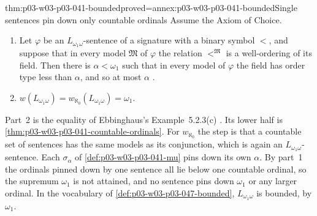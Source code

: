 \begin{hbcorollary}{thm:p03-w03-p03-041-bounded}{proved=annex:p03-w03-p03-041-bounded}{Single sentences pin down only countable ordinals}
Assume the Axiom of Choice.
\begin{enumerate}
\item Let \(\varphi\) be an \(L_{\omega_1\omega}\)-sentence of a signature
      with a binary symbol \(<\), and suppose that in every model
      \(\mathfrak M\) of \(\varphi\) the relation \(<^{\mathfrak M}\) is a
      well-ordering of its field. Then there is \(\alpha<\omega_1\) such
      that in every model of \(\varphi\) the field has order type less
      than \(\alpha\), and so at most \(\alpha\)
      \cite[Corollary~4.28, p.~52]{Marker2014InfinitaryNotes}.
\item \(w(L_{\omega_1\omega})=w_{\aleph_0}(L_{\omega_1\omega})=\omega_1\).
\end{enumerate}
\end{hbcorollary}

Part~2 is the equality of Ebbinghaus's Example~5.2.3(c)
\cite[Ch.~II, Example~5.2.3(c), pp.~61--62]{Ebbinghaus1985ExtendedLogics}.
Its lower half is \cref{thm:p03-w03-p03-041-countable-ordinals}. For
\(w_{\aleph_0}\) the step is that a countable set of sentences has the
same models as its conjunction, which is again an
\(L_{\omega_1\omega}\)-sentence. Each \(\sigma_\alpha\) of
\cref{def:p03-w03-p03-041-mu} pins down its own \(\alpha\). By part~1
the ordinals pinned down by one sentence all lie below one countable
ordinal, so the supremum \(\omega_1\) is not attained, and no sentence
pins down \(\omega_1\) or any larger ordinal. In the vocabulary
of \cref{def:p03-w03-p03-047-bounded}, \(L_{\omega_1\omega}\) is bounded,
by \(\omega_1\).

